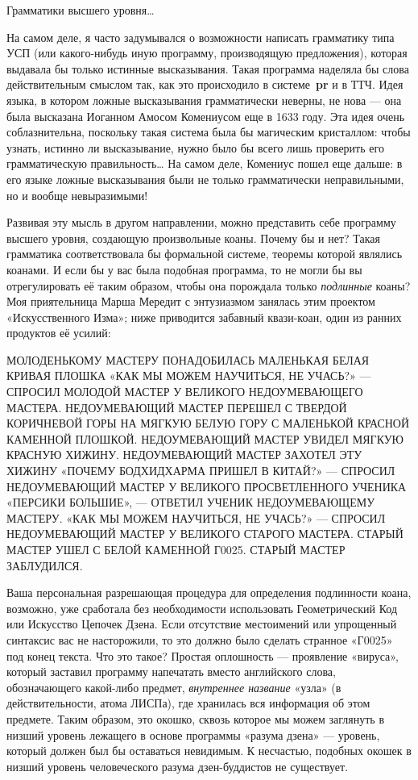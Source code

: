 \documentclass[../main.tex]{subfiles}
\begin{document}
Грамматики высшего уровня\ldots{}

На самом деле, я часто задумывался о возможности написать грамматику типа УСП (или какого-нибудь иную программу, производящую предложения), которая выдавала бы только истинные высказывания. Такая программа наделяла бы слова действительным смыслом так, как это происходило в системе~\textbf{pr} и в ТТЧ\@. Идея языка, в котором ложные высказывания грамматически неверны, не нова --- она была высказана Иоганном Амосом Комениусом еще в 1633 году. Эта идея очень соблазнительна, поскольку такая система была бы магическим кристаллом: чтобы узнать, истинно ли высказывание, нужно было бы всего лишь проверить его грамматическую правильность\ldots{} На самом деле, Комениус пошел еще дальше: в его языке ложные высказывания были не только грамматически неправильными, но и вообще невыразимыми!

Развивая эту мысль в другом направлении, можно представить себе программу высшего уровня, создающую произвольные коаны. Почему бы и нет? Такая грамматика соответствовала бы формальной системе, теоремы которой являлись коанами. И если бы у вас была подобная программа, то не могли бы вы отрегулировать её таким образом, чтобы она порождала только \emph{подлинные} коаны? Моя приятельница Марша Мередит с энтузиазмом занялась этим проектом «Искусственного Изма»; ниже приводится забавный квази-коан, один из ранних продуктов её усилий:

МОЛОДЕНЬКОМУ МАСТЕРУ ПОНАДОБИЛАСЬ МАЛЕНЬКАЯ БЕЛАЯ КРИВАЯ ПЛОШКА «КАК МЫ МОЖЕМ НАУЧИТЬСЯ, НЕ УЧАСЬ?» --- СПРОСИЛ МОЛОДОЙ МАСТЕР У ВЕЛИКОГО НЕДОУМЕВАЮЩЕГО МАСТЕРА. НЕДОУМЕВАЮЩИЙ МАСТЕР ПЕРЕШЕЛ С ТВЕРДОЙ КОРИЧНЕВОЙ ГОРЫ НА МЯГКУЮ БЕЛУЮ ГОРУ С МАЛЕНЬКОЙ КРАСНОЙ КАМЕННОЙ ПЛОШКОЙ. НЕДОУМЕВАЮЩИЙ МАСТЕР УВИДЕЛ МЯГКУЮ КРАСНУЮ ХИЖИНУ. НЕДОУМЕВАЮЩИЙ МАСТЕР ЗАХОТЕЛ ЭТУ ХИЖИНУ «ПОЧЕМУ БОДХИДХАРМА ПРИШЕЛ В КИТАЙ?» --- СПРОСИЛ НЕДОУМЕВАЮЩИЙ МАСТЕР У ВЕЛИКОГО ПРОСВЕТЛЕННОГО УЧЕНИКА «ПЕРСИКИ БОЛЬШИЕ», --- ОТВЕТИЛ УЧЕНИК НЕДОУМЕВАЮЩЕМУ МАСТЕРУ. «КАК МЫ МОЖЕМ НАУЧИТЬСЯ, НЕ УЧАСЬ?» --- СПРОСИЛ НЕДОУМЕВАЮЩИЙ МАСТЕР У ВЕЛИКОГО СТАРОГО МАСТЕРА. СТАРЫЙ МАСТЕР УШЕЛ С БЕЛОЙ КАМЕННОЙ Г0025. СТАРЫЙ МАСТЕР ЗАБЛУДИЛСЯ.

Ваша персональная разрешающая процедура для определения подлинности коана, возможно, уже сработала без необходимости использовать Геометрический Код или Искусство Цепочек Дзена. Если отсутствие местоимений или упрощенный синтаксис вас не насторожили, то это должно было сделать странное «Г0025» под конец текста. Что это такое? Простая оплошность --- проявление «вируса», который заставил программу напечатать вместо английского слова, обозначающего какой-либо предмет, \emph{внутреннее название} «узла» (в действительности, атома ЛИСПа), где хранилась вся информация об этом предмете. Таким образом, это окошко, сквозь которое мы можем заглянуть в низший уровень лежащего в основе программы «разума дзена» --- уровень, который должен был бы оставаться невидимым. К несчастью, подобных окошек в низший уровень человеческого разума дзен-буддистов не существует.
\end{document}
